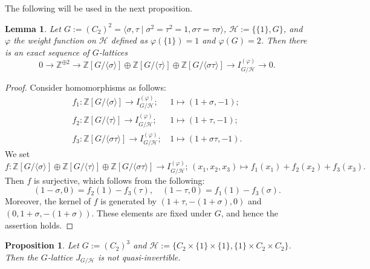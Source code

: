 \documentclass[12pt]{amsart}
\theoremstyle{plain}
\newtheorem{prop}[thm]{Proposition}
\newtheorem{lem}[thm]{Lemma}
\theoremstyle{definition}
\numberwithin{thm}{section}
\numberwithin{equation}{section}
\newcommand{\Z}{\mathbb{Z}}
\newcommand{\cH}{\mathcal{H}}
\begin{document}
The following will be used in the next proposition. 

\begin{lem}\label{lem:v4qp}
Let $G:=(C_{2})^{2}=\langle \sigma,\tau \mid \sigma^{2}=\tau^{2}=1,\sigma\tau=\tau \sigma \rangle$, $\cH:=\{\{1\},G\}$, and $\varphi$ the weight function on $\cH$ defined as $\varphi(\{1\})=1$ and $\varphi(G)=2$. Then there is an exact sequence of $G$-lattices
\begin{equation*}
0\rightarrow \Z^{\oplus 2}\rightarrow \Z[G/\langle \sigma \rangle]\oplus \Z[G/\langle \tau \rangle]\oplus \Z[G/\langle \sigma \tau \rangle] \rightarrow I_{G/\cH}^{(\varphi)}\rightarrow 0. 
\end{equation*}
\end{lem}

\begin{proof}
Consider homomorphisms as follows: 
\begin{align*}
f_{1}\colon \Z[G/\langle \sigma \rangle]\rightarrow I_{G/\cH}^{(\varphi)};&\, 1\mapsto (1+\sigma,-1);\\
f_{2}\colon \Z[G/\langle \tau \rangle]\rightarrow I_{G/\cH}^{(\varphi)};&\, 1\mapsto (1+\tau,-1);\\
f_{3}\colon \Z[G/\langle \sigma \tau \rangle]\rightarrow I_{G/\cH}^{(\varphi)};&\, 1\mapsto (1+\sigma \tau,-1). 
\end{align*}
We set
\begin{equation*}
f\colon \Z[G/\langle \sigma \rangle]\oplus \Z[G/\langle \tau \rangle]\oplus \Z[G/\langle \sigma \tau \rangle]\rightarrow I_{G/\cH}^{(\varphi)};\,(x_{1},x_{2},x_{3})\mapsto f_{1}(x_{1})+f_{2}(x_{2})+f_{3}(x_{3}). 
\end{equation*}
Then $f$ is surjective, which follows from the following: 
\begin{equation*}
    (1-\sigma,0)=f_{2}(1)-f_{3}(\tau),\quad 
    (1-\tau,0)=f_{1}(1)-f_{3}(\sigma). 
\end{equation*}
Moreover, the kernel of $f$ is generated by $(1+\tau,-(1+\sigma),0)$ and $(0,1+\sigma,-(1+\sigma))$. These elements are fixed under $G$, and hence the assertion holds. 
\end{proof}

\begin{prop}\label{prop:apt1}
Let $G:=(C_{2})^{3}$ and $\cH:=\{C_{2}\times \{1\}\times \{1\},\{1\}\times C_{2}\times C_{2} \}$. Then the $G$-lattice $J_{G/\cH}$ is not quasi-invertible. 
\end{prop}
\end{document}
